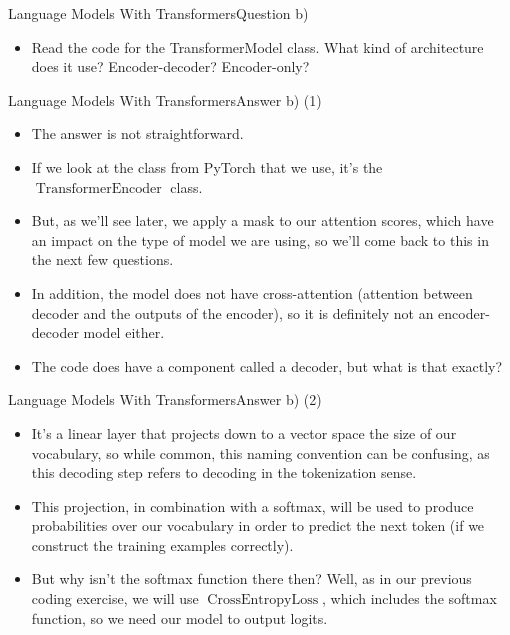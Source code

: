 \documentclass[t]{beamer}
\newcommand\op[1]{\operatorname{#1}}
\begin{document}
\begin{frame}{Language Models With Transformers}{Question b)}
    \begin{itemize}
        \item Read the code for the TransformerModel class. What kind of
              architecture does it use? Encoder-decoder? Encoder-only?
    \end{itemize}
\end{frame}

\begin{frame}{Language Models With Transformers}{Answer b) (1)}
    \begin{itemize}
        \item The answer is not straightforward.
        \item If we look at the class from PyTorch that we use, it's the
              $\op{TransformerEncoder}$ class.
        \item But, as we'll see later, we apply a mask to our attention scores,
              which have an impact on the type of model we are using, so we'll
              come back to this in the next few questions.
        \item In addition, the model does not have cross-attention (attention
              between decoder and the outputs of the encoder), so it is
              definitely not an encoder-decoder model either.
        \item The code does have a component called a decoder, but what is that
              exactly?
    \end{itemize}
\end{frame}

\begin{frame}{Language Models With Transformers}{Answer b) (2)}
    \begin{itemize}
        \item It's a linear layer that projects down to a vector space the size
              of our vocabulary, so while common, this naming convention can be
              confusing, as this decoding step refers to decoding in the
              tokenization sense.
        \item This projection, in combination with a softmax, will be used to
              produce probabilities over our vocabulary in order to predict the
              next token (if we construct the training examples correctly).
        \item But why isn't the softmax function there then?
              Well, as in our previous coding exercise, we will use
              $\op{CrossEntropyLoss}$, which includes the softmax function, so
              we need our model to output logits.
    \end{itemize}
\end{frame}
\end{document}
